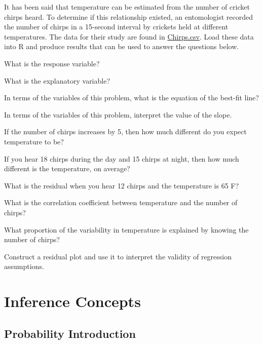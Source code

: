 \documentclass[10pt,openany]{book}\usepackage[]{graphicx}\usepackage[]{color}
\begin{document}
\begin{exsection}
  \item \label{revex:RegChirps} \rhw{} It has been said that temperature can be estimated from the number of cricket chirps heard.  To determine if this relationship existed, an entomologist recorded the number of chirps in a 15-second interval by crickets held at different temperatures.  The data for their study are found in \href{https://raw.githubusercontent.com/droglenc/NCData/master/Chirps.csv}{Chirps.csv}.  Load these data into R and produce results that can be used to answer the questions below. 
    \begin{Enumerate}
      \item What is the response variable?
      \item What is the explanatory variable?
      \item In terms of the variables of this problem, what is the equation of the best-fit line?
      \item In terms of the variables of this problem, interpret the value of the slope.
      \item If the number of chirps increases by 5, then how much different do you expect temperature to be?
      \item If you hear 18 chirps during the day and 15 chirps at night, then how much different is the temperature, on average?
      \item What is the residual when you hear 12 chirps and the temperature is 65 F?
      \item What is the correlation coefficient between temperature and the number of chirps?
      \item What proportion of the variability in temperature is explained by knowing the number of chirps?
      \item Construct a residual plot and use it to interpret the validity of regression assumptions.
    \end{Enumerate}

\end{exsection}

    \part{Inference Concepts}



\chapter{Probability Introduction} \label{chap:ProbIntro}
\end{document}
